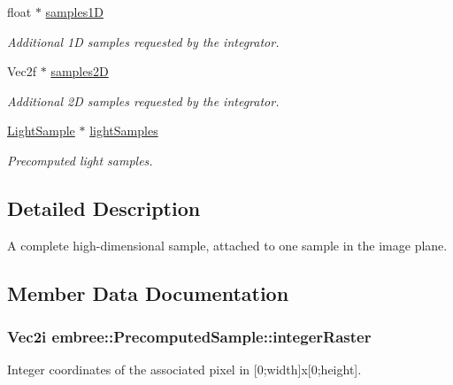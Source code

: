 \begin{DoxyCompactItemize}
float $\ast$ \hyperlink{structembree_1_1_precomputed_sample_a2043d5a1909742b1601a5e235cbb74b1}{samples1D}
\begin{DoxyCompactList}\small\item\em Additional 1D samples requested by the integrator. \item\end{DoxyCompactList}\item 
Vec2f $\ast$ \hyperlink{structembree_1_1_precomputed_sample_abbe8fc7c30fc8505f82606996032dd3b}{samples2D}
\begin{DoxyCompactList}\small\item\em Additional 2D samples requested by the integrator. \item\end{DoxyCompactList}\item 
\hyperlink{structembree_1_1_light_sample}{LightSample} $\ast$ \hyperlink{structembree_1_1_precomputed_sample_acfe1e485e8834d42e38cc076b7b40bc5}{lightSamples}
\begin{DoxyCompactList}\small\item\em Precomputed light samples. \item\end{DoxyCompactList}\end{DoxyCompactItemize}


\subsection{Detailed Description}
A complete high-\/dimensional sample, attached to one sample in the image plane. 

\subsection{Member Data Documentation}
\hypertarget{structembree_1_1_precomputed_sample_adec22f991b28ee05f8f7297964918ab1}{
\subsubsection[{integerRaster}]{\setlength{\rightskip}{0pt plus 5cm}Vec2i {\bf embree::PrecomputedSample::integerRaster}}}
\label{structembree_1_1_precomputed_sample_adec22f991b28ee05f8f7297964918ab1}


Integer coordinates of the associated pixel in \mbox{[}0;width\mbox{]}x\mbox{[}0;height\mbox{]}. 

